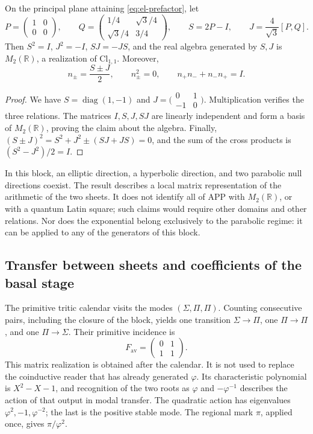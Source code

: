 \begin{proposition}
On the principal plane attaining \eqref{eq:el-prefactor}, let
\[
 P=\begin{pmatrix}1&0\\0&0\end{pmatrix},\qquad
 Q=\begin{pmatrix}1/4&\sqrt3/4\\\sqrt3/4&3/4\end{pmatrix},\qquad
 S=2P-I,\qquad J=\frac4{\sqrt3}[P,Q].
\]
Then \(S^2=I\), \(J^2=-I\), \(SJ=-JS\), and the real algebra
generated by \(S,J\) is \(M_2(\mathbb R)\), a realization of
\(\mathrm{Cl}_{1,1}\). Moreover,
\[
 n_\pm=\frac{S\pm J}{2},\qquad
 n_\pm^2=0,\qquad n_+n_-+n_-n_+=I.
\]
\end{proposition}
\begin{proof}
We have \(S=\operatorname{diag}(1,-1)\) and
\(J=\bigl(\begin{smallmatrix}0&1\\-1&0\end{smallmatrix}\bigr)\).
Multiplication verifies the three relations. The matrices
\(I,S,J,SJ\) are linearly independent and form a basis of
\(M_2(\mathbb R)\), proving the claim about the algebra.
Finally, \((S\pm J)^2=S^2+J^2\pm(SJ+JS)=0\), and the sum of the
cross products is \((S^2-J^2)/2=I\).
\end{proof}

In this block, an elliptic direction, a hyperbolic direction, and two
parabolic null directions coexist. The result describes a local
matrix representation of the arithmetic of the two sheets. It does not identify all of APP
with \(M_2(\mathbb R)\), or with a quantum Latin square; such
claims would require other domains and other relations. Nor does the
exponential belong exclusively to the parabolic regime: it can
be applied to any of the generators of this block.



\subsection{Transfer between sheets and coefficients of the basal stage}

The primitive tritic calendar visits the modes
\((\Sigma,\Pi,\Pi)\). Counting consecutive pairs, including the
closure of the block, yields one transition \(\Sigma\to\Pi\), one
\(\Pi\to\Pi\), and one \(\Pi\to\Sigma\). Their primitive incidence is
\[
 F_{\mathrm{av}}=\begin{pmatrix}0&1\\1&1\end{pmatrix}.
\]
This matrix realization is obtained after the calendar. It is not
used to replace the coinductive reader that has already generated \(\varphi\).
Its characteristic polynomial is \(X^2-X-1\), and recognition of the
two roots as \(\varphi\) and \(-\varphi^{-1}\) describes the action of
that output in modal transfer. The quadratic action has eigenvalues
\(\varphi^2,-1,\varphi^{-2}\); the last is the positive stable mode.
The regional mark \(\pi\), applied once, gives
\(\pi/\varphi^2\).

